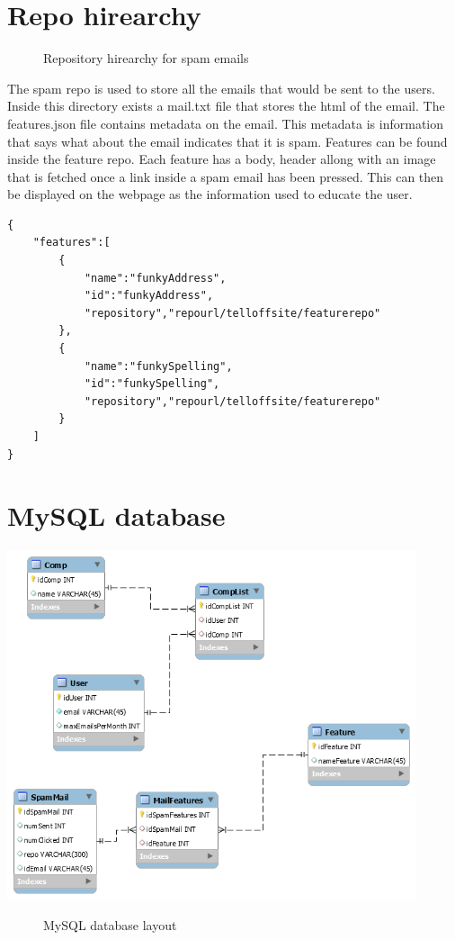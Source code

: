 \documentclass{article}
\begin{document}
\section{Repo hirearchy}

\begin{figure}[H]
\caption{Repository hirearchy for spam emails}
\end{figure}

The spam repo is used to store all the emails that would be sent to the users. Inside this directory exists a mail.txt file that stores the html of the email. The features.json file contains metadata on the email. This metadata is information that says what about the email indicates that it is spam. Features can be found inside the feature repo. Each feature has a body, header allong with an image that is fetched once a link inside a spam email has been pressed. This can then be displayed on the webpage as the information used to educate the user.

\begin{lstlisting}[frame=single, caption={features.json}]
{
    "features":[
        {
            "name":"funkyAddress",
            "id":"funkyAddress",
            "repository","repourl/telloffsite/featurerepo"
        },
        {
            "name":"funkySpelling",
            "id":"funkySpelling",
            "repository","repourl/telloffsite/featurerepo"
        }
    ]
}
\end{lstlisting}

\section{MySQL database}
\begin{center}
    \centering
    \includegraphics[width=0.9\textwidth]{database}
    \begin{figure}[H]
        \caption{MySQL database layout}
    \end{figure}
\end{center}
\end{document}
